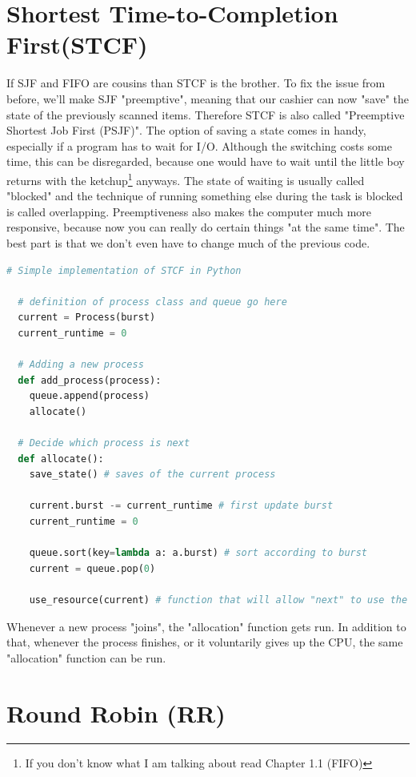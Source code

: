 \documentclass{report}
\newcounter{defi}[section]\setcounter{defi}{0}
\begin{document}
\section{Shortest Time-to-Completion First(STCF)}

If SJF and FIFO are cousins than STCF is the brother.
To fix the issue from before, we'll make SJF "preemptive", meaning that our cashier can now "save" the state of the previously scanned items. 
Therefore STCF is also called "Preemptive Shortest Job First (PSJF)".
The option of saving a state comes in handy, especially if a program has to wait for I/O.
Although the switching costs some time, this can be disregarded, because one would have to wait until the little boy returns with the ketchup\footnote{If you don't know what I am talking about read Chapter 1.1 (FIFO)} anyways.
The state of waiting is usually called "blocked" and the technique of running something else during the task is blocked is called overlapping.
Preemptiveness also makes the computer much more responsive, because now you can really do certain things "at the same time".
The best part is that we don't even have to change much of the previous code.
\pagebreak
\begin{lstlisting}[language=Python, style=colorEX, label=cd:stcf-python]
  # Simple implementation of STCF in Python
  
  # definition of process class and queue go here
  current = Process(burst)
  current_runtime = 0
  
  # Adding a new process
  def add_process(process): 
    queue.append(process)
    allocate()
  
  # Decide which process is next
  def allocate():
    save_state() # saves of the current process

    current.burst -= current_runtime # first update burst
    current_runtime = 0

    queue.sort(key=lambda a: a.burst) # sort according to burst
    current = queue.pop(0)

    use_resource(current) # function that will allow "next" to use the CPU (also tracks runtime)
\end{lstlisting}
Whenever a new process "joins", the "allocation" function gets run.
In addition to that, whenever the process finishes, or it voluntarily gives up the CPU, the same "allocation" function can be run.


\section{Round Robin (RR)}
\end{document}
